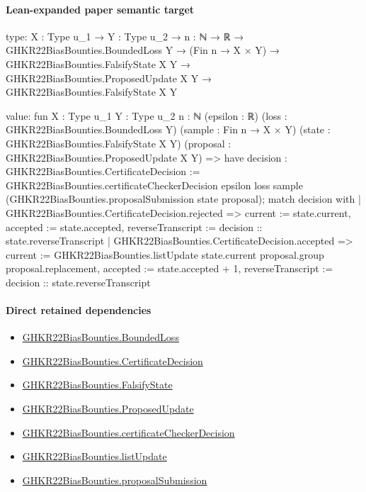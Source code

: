 \documentclass[10pt]{article}
\begin{document}
\paragraph{Lean-expanded paper semantic target}
\begin{ReviewVerbatim}
type:
{X : Type u_1} →
  {Y : Type u_2} →
    {n : ℕ} →
      ℝ →
        GHKR22BiasBounties.BoundedLoss Y →
          (Fin n → X × Y) →
            GHKR22BiasBounties.FalsifyState X Y →
              GHKR22BiasBounties.ProposedUpdate X Y → GHKR22BiasBounties.FalsifyState X Y

value:
fun {X : Type u_1} {Y : Type u_2} {n : ℕ} (epsilon : ℝ) (loss : GHKR22BiasBounties.BoundedLoss Y)
    (sample : Fin n → X × Y) (state : GHKR22BiasBounties.FalsifyState X Y)
    (proposal : GHKR22BiasBounties.ProposedUpdate X Y) =>
  have decision : GHKR22BiasBounties.CertificateDecision :=
    GHKR22BiasBounties.certificateCheckerDecision epsilon loss sample
      (GHKR22BiasBounties.proposalSubmission state proposal);
  match decision with
  | GHKR22BiasBounties.CertificateDecision.rejected =>
    { current := state.current, accepted := state.accepted, reverseTranscript := decision :: state.reverseTranscript }
  | GHKR22BiasBounties.CertificateDecision.accepted =>
    { current := GHKR22BiasBounties.listUpdate state.current proposal.group proposal.replacement,
      accepted := state.accepted + 1, reverseTranscript := decision :: state.reverseTranscript }
\end{ReviewVerbatim}

\paragraph{Direct retained dependencies}
\begin{itemize}\raggedright
\item \hyperlink{paper-prerequisite-ef6c319b0770dad4}{GHKR22\allowbreak{}Bias\allowbreak{}Bounties.\allowbreak{}Bounded\allowbreak{}Loss}
\item \hyperlink{governing-declaration-7881732e3fc3c15e}{GHKR22\allowbreak{}Bias\allowbreak{}Bounties.\allowbreak{}Certificate\allowbreak{}Decision}
\item \hyperlink{governing-declaration-945c447c5e0dfafd}{GHKR22\allowbreak{}Bias\allowbreak{}Bounties.\allowbreak{}Falsify\allowbreak{}State}
\item \hyperlink{governing-declaration-e47349c87d11953f}{GHKR22\allowbreak{}Bias\allowbreak{}Bounties.\allowbreak{}Proposed\allowbreak{}Update}
\item \hyperlink{paper-prerequisite-f66f083361731baf}{GHKR22\allowbreak{}Bias\allowbreak{}Bounties.\allowbreak{}certificate\allowbreak{}Checker\allowbreak{}Decision}
\item \hyperlink{paper-prerequisite-6c3f0056117b6991}{GHKR22\allowbreak{}Bias\allowbreak{}Bounties.\allowbreak{}list\allowbreak{}Update}
\item \hyperlink{governing-declaration-352b600f7ad9d7b2}{GHKR22\allowbreak{}Bias\allowbreak{}Bounties.\allowbreak{}proposal\allowbreak{}Submission}
\end{itemize}
\end{document}
